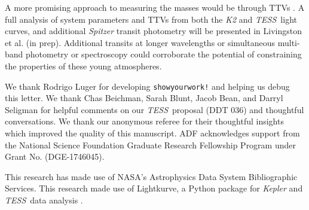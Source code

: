 \documentclass[twocolumn]{aastex631}
\newcommand{\tess}{\textit{TESS}}
\begin{document}
A more promising approach to measuring the masses would be through TTVs \citep{agol18}. A full analysis of system parameters and TTVs from both the \textit{K2} and \tess\ light curves, and additional \textit{Spitzer} transit photometry will be presented in Livingston et al. (in prep). Additional transits at longer wavelengths or simultaneous multi-band photometry or spectroscopy could corroborate the potential of constraining the properties of these young atmospheres.


\begin{acknowledgments}
We thank Rodrigo Luger for developing \texttt{showyourwork!} \citep{luger21} and helping us debug this letter. We thank Chas Beichman, Sarah Blunt, Jacob Bean, and Darryl Seligman for helpful comments on our \tess\ proposal (DDT 036) and thoughtful conversations. We thank our anonymous referee for their thoughtful insights which improved the quality of this manuscript. ADF acknowledges support from the National Science Foundation Graduate Research Fellowship Program under Grant No. (DGE-1746045).

This research has made use of NASA's Astrophysics Data System Bibliographic Services. This research made use of Lightkurve, a Python package for \textit{Kepler} and \tess\ data analysis \citep{lightkurve}.

\end{acknowledgments}
\end{document}
